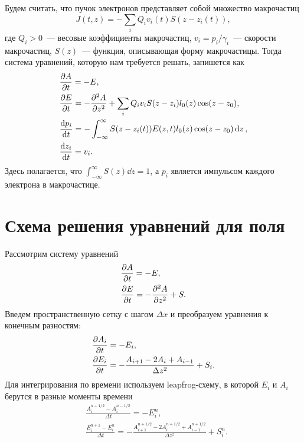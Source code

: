 \documentclass[DIV=11,12pt,a4paper]{scrartcl}
\begin{document}
Будем считать, что пучок электронов представляет собой множество макрочастиц
\begin{equation}
    J(t,z) = -\sum_i Q_i v_i(t) S(z - z_i(t)),
\end{equation}
где $Q_i > 0$~--- весовые коэффициенты макрочастиц, $v_i = p_i / \gamma_i$~--- скорости макрочастиц, $S(z)$~--- функция, описывающая форму макрочастицы.
Тогда система уравнений, которую нам требуется решать, запишется как
\begin{align}
    &\pdv{A}{t} = - E,\\
    &\pdv{E}{t} = -\pdv[2]{A}{z} + \sum_i Q_i v_i S(z - z_i) l_0(z) \cos (z-z_0),\\
    &\dv{p_i}{t} = -\int_{-\infty}^{\infty} S(z-z_i(t)) E(z,t) l_0(z)  \cos (z-z_0) \dd{z},\\
    &\dv{z_i}{t} = v_i.
\end{align}
Здесь полагается, что $\int_{-\infty}^\infty S(z) \dd{z} = 1$, а $p_i$ является импульсом каждого электрона в макрочастице.

\section{Схема решения уравнений для поля}

Рассмотрим систему уравнений 
\begin{align}
    &\pdv{A}{t} = -E,\\
    &\pdv{E}{t} = -\pdv[2]{A}{z} + S.
\end{align}
Введем пространственную сетку с шагом $\Delta x$ и преобразуем уравнения к конечным разностям:
\begin{align}
    &\pdv{A_i}{t} = -E_i,\\
    &\pdv{E_i}{t} = - \frac{A_{i+1} - 2 A_i + A_{i-1}}{\Delta z^2} + S_i.
\end{align}
Для интегрирования по времени используем leapfrog-схему, в которой $E_i$ и $A_i$ берутся в разные моменты времени
\begin{align}
    &\frac{A_i^{n+1/2} - A_i^{n-1/2}}{\Delta t} = - E_i^n,\\
    &\frac{E_i^{n+1} - E_i^{n}}{\Delta t} = - \frac{A_{i+1}^{n+1/2} - 2 A_i^{n+1/2} + A_{i-1}^{n+1/2}}{\Delta z^2} + S_i^n.
\end{align}
\end{document}

